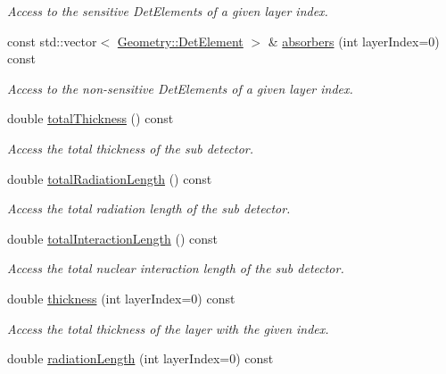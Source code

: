 \begin{DoxyCompactItemize}
\begin{DoxyCompactList}\small\item\em Access to the sensitive Det\+Elements of a given layer index. \end{DoxyCompactList}\item 
const std\+::vector$<$ \hyperlink{class_d_d4hep_1_1_geometry_1_1_det_element}{Geometry\+::\+Det\+Element} $>$ \& \hyperlink{class_d_d4hep_1_1_d_d_rec_1_1_layered_subdetector_a4862f154cb8951a588a0091cb76bd17e}{absorbers} (int layer\+Index=0) const
\begin{DoxyCompactList}\small\item\em Access to the non-\/sensitive Det\+Elements of a given layer index. \end{DoxyCompactList}\item 
double \hyperlink{class_d_d4hep_1_1_d_d_rec_1_1_layered_subdetector_a0a47efb56ee534813273f42808502921}{total\+Thickness} () const
\begin{DoxyCompactList}\small\item\em Access the total thickness of the sub detector. \end{DoxyCompactList}\item 
double \hyperlink{class_d_d4hep_1_1_d_d_rec_1_1_layered_subdetector_a2534d1e99f8d2f33aa28398fac9810b2}{total\+Radiation\+Length} () const
\begin{DoxyCompactList}\small\item\em Access the total radiation length of the sub detector. \end{DoxyCompactList}\item 
double \hyperlink{class_d_d4hep_1_1_d_d_rec_1_1_layered_subdetector_a5b22049dfabd7fa556ba0c18e78daa3a}{total\+Interaction\+Length} () const
\begin{DoxyCompactList}\small\item\em Access the total nuclear interaction length of the sub detector. \end{DoxyCompactList}\item 
double \hyperlink{class_d_d4hep_1_1_d_d_rec_1_1_layered_subdetector_ad9137940a82be255808d475379d292b6}{thickness} (int layer\+Index=0) const
\begin{DoxyCompactList}\small\item\em Access the total thickness of the layer with the given index. \end{DoxyCompactList}\item 
double \hyperlink{class_d_d4hep_1_1_d_d_rec_1_1_layered_subdetector_addf81ffffc91b391f0ccd62c37a084a1}{radiation\+Length} (int layer\+Index=0) const

\end{DoxyCompactItemize}
